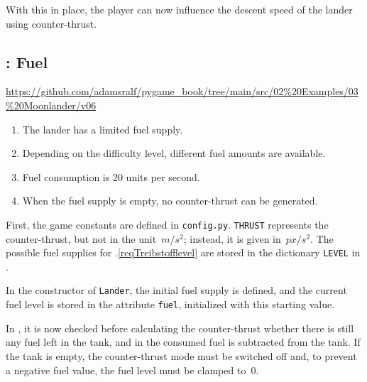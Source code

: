With this in place, the player can now influence the descent speed of the lander using counter-thrust.

\subsection{: Fuel}
\begin{diskbox}
	\url{https://github.com/adamsralf/pygame_book/tree/main/src/02%20Examples/03%20Moonlander/v06}
\end{diskbox}

\begin{enumerate}
	\item The lander has a limited fuel supply.\label{reqTreibstoffvorrat}
	\item Depending on the difficulty level, different fuel amounts are available.\label{reqTreibstofflevel}
	\item Fuel consumption is 20 units per second.\label{reqTreibstoffverbrauch}
	\item When the fuel supply is empty, no counter-thrust can be generated.\label{reqTreibstoffende}
\end{enumerate}
\er

First, the game constants are defined in \texttt{config.py}. \texttt{THRUST} represents the counter-thrust, but not in the unit~$\unit{m/s^2}$; instead, it is given in~$\unit{px/s^2}$. The possible fuel supplies for .\ref{reqTreibstofflevel} are stored in the dictionary \texttt{LEVEL} in .


In the constructor of \texttt{Lander}, the initial fuel supply is defined, and the current fuel level is stored in the attribute \texttt{fuel}, initialized with this starting value.


In , it is now checked before calculating the counter-thrust whether there is still any fuel left in the tank, and in  the consumed fuel is subtracted from the tank. If the tank is empty, the counter-thrust mode must be switched off and, to prevent a negative fuel value, the fuel level must be clamped to~$0$.


